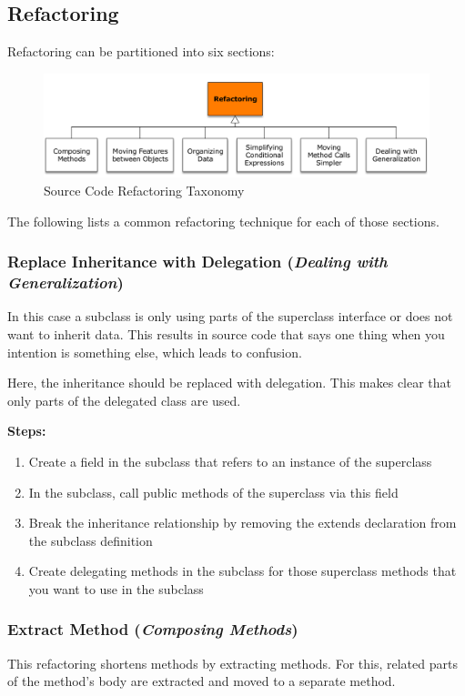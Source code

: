 \subsection{Refactoring}
Refactoring can be partitioned into six sections:

\begin{figure}[h]
	\centering
	\includegraphics[width=\linewidth]{images/refactoring_taxonomy}
	\caption{Source Code Refactoring Taxonomy}
\end{figure}

The following lists a common refactoring technique for each of those sections.


\subsubsection*{Replace Inheritance with Delegation (\textit{Dealing with Generalization})}
In this case a subclass is only using parts of the superclass interface or does not want to inherit data.
This results in source code that says one thing when you intention is something else, which leads to confusion.

Here, the inheritance should be replaced with delegation.
This makes clear that only parts of the delegated class are used.\newline 

\textbf{Steps:}
\begin{enumerate}
	\item Create a field in the subclass that refers to an instance of the superclass
	\item In the subclass, call public methods of the superclass via this
	field
	\item Break the inheritance relationship by removing the extends declaration from the subclass definition
	\item Create delegating methods in the subclass for those
	superclass methods that you want to use in the subclass
\end{enumerate}

\subsubsection*{Extract Method (\textit{Composing Methods})}
This refactoring shortens methods by extracting methods.
For this, related parts of the method's body are extracted and moved to a separate method.

